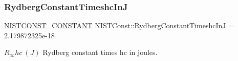 \subsubsection{\texorpdfstring{Rydberg\+Constant\+Timeshc\+InJ}{RydbergConstantTimeshcInJ}}
{\footnotesize\ttfamily \mbox{\hyperlink{group___n_i_s_t_const-_macros_ga2b0fc1d7452373f816175dd86ce26729}{N\+I\+S\+T\+C\+O\+N\+S\+T\+\_\+\+C\+O\+N\+S\+T\+A\+NT}} N\+I\+S\+T\+Const\+::\+Rydberg\+Constant\+Timeshc\+InJ = 2.\+179872325e-\/18}

$R_\infty hc \ (J)$ Rydberg constant times hc in joules. 